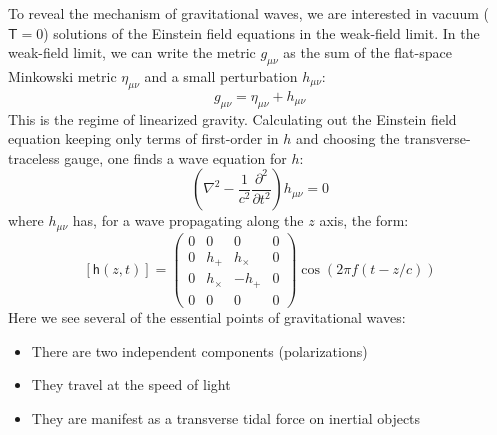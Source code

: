 To reveal the mechanism of gravitational waves, we are interested in
vacuum ($\mathsf{T}=0$) solutions of the Einstein field equations in
the weak-field limit.  In the weak-field limit, we can write the
metric $g_{\mu\nu}$ as the sum of the flat-space Minkowski metric
$\eta_{\mu\nu}$ and a small perturbation $h_{\mu\nu}$:
$$g_{\mu\nu} = \eta_{\mu\nu} + h_{\mu\nu}$$ This is the regime of
linearized gravity.  Calculating out the Einstein field equation
keeping only terms of first-order in $h$ and choosing the
transverse-traceless gauge, one finds\cite{Carroll1997Lecture} a wave
equation for $h$:
$$\left(\nabla^2 - \frac{1}{c^2}\frac{\partial^2}{\partial t^2}\right)h_{\mu\nu} = 0$$
where $h_{\mu\nu}$ has, for a wave propagating along the $z$ axis, the form:
$$ [\mathsf{h}(z,t)] = \left(
\begin{array}{cccc}
0 & 0       &  0      & 0 \\
0 & h_+     &  h_\times & 0 \\
0 & h_\times & -h_+     & 0 \\ 
0 & 0       &  0      & 0 
\end{array}
 \right) \cos\left(2\pi f (t - z/c)\right)
$$
Here we see several of the essential points of gravitational waves:
\begin{itemize}
\item There are two independent components (polarizations)
\item They travel at the speed of light 
\item They are manifest as a transverse tidal force on inertial objects
\end{itemize}

